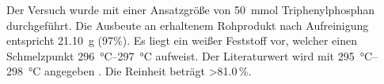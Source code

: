 Der Versuch wurde mit einer Ansatzgröße von \SI{50}{\milli\mole} Triphenylphosphan durchgeführt. 
Die Ausbeute an erhaltenem Rohprodukt nach Aufreinigung entspricht \SI{21.10}{\gram} (97\%).
Es liegt ein weißer Feststoff vor, welcher einen Schmelzpunkt \SI{296}{\degreeCelsius}--\SI{297}{\degreeCelsius} aufweist. Der Literaturwert wird mit \SI{295}{\degreeCelsius}--\SI{298}{\degreeCelsius} angegeben \cite{SA}. Die Reinheit beträgt >81.0\,\%.